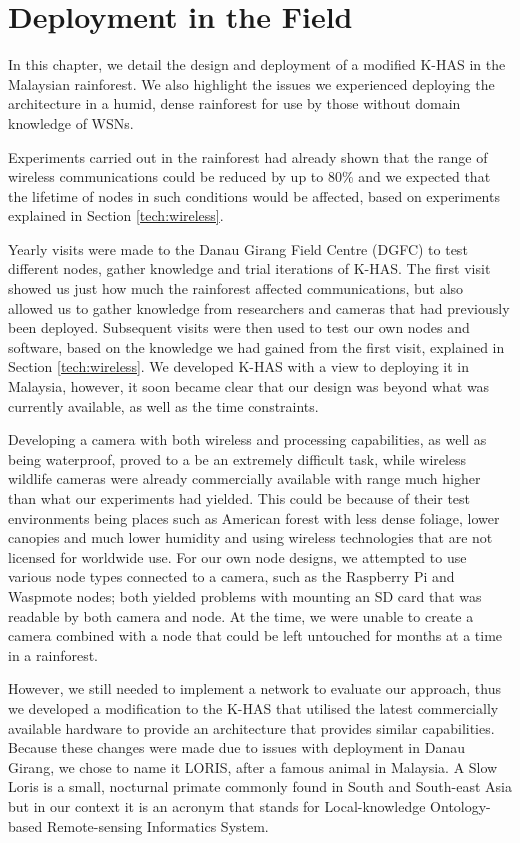 \chapter{Deployment in the Field}\label{chap:imp}
	In this chapter, we detail the design and deployment of a modified K-HAS in the Malaysian rainforest. We also highlight the issues we experienced deploying the architecture in a humid, dense rainforest for use by those without domain knowledge of WSNs.
	
	Experiments carried out in the rainforest had already shown that the range of wireless communications could be reduced by up to 80\% and we expected that the lifetime of nodes in such conditions would be affected, based on experiments explained in Section \ref{tech:wireless}.
	
	Yearly visits were made to the Danau Girang Field Centre (DGFC) to test different nodes, gather knowledge and trial iterations of K-HAS. The first visit showed us just how much the rainforest affected communications, but also allowed us to gather knowledge from researchers and cameras that had previously been deployed. Subsequent visits were then used to test our own nodes and software, based on the knowledge we had gained from the first visit, explained in Section \ref{tech:wireless}. We developed K-HAS with a view to deploying it in Malaysia, however, it soon became clear that our design was  beyond what was currently available, as well as the time constraints.
	
	Developing a camera with both wireless and processing capabilities, as well as being waterproof, proved to a be an extremely difficult task, while wireless wildlife cameras were already commercially available with range much higher than what our experiments had yielded. This could be because of their test environments being places such as American forest with less dense foliage, lower canopies and much lower humidity and using wireless technologies that are not licensed for worldwide use. For our own node designs, we attempted to use various node types connected to a camera, such as the Raspberry Pi and Waspmote nodes; both yielded problems with mounting an SD card that was readable by both camera and node. At the time, we were unable to create a camera combined with a node that could be left untouched for months at a time in a rainforest.
	
	However, we still needed to implement a network to evaluate our approach, thus we developed a modification to the K-HAS that utilised the latest commercially available hardware to provide an architecture that provides similar capabilities. Because these changes were made due to issues with deployment in Danau Girang, we chose to name it LORIS, after a famous animal in Malaysia. A Slow Loris is a small, nocturnal primate commonly found in South and South-east Asia but in our context it is an acronym that stands for Local-knowledge Ontology-based Remote-sensing Informatics System.
	
